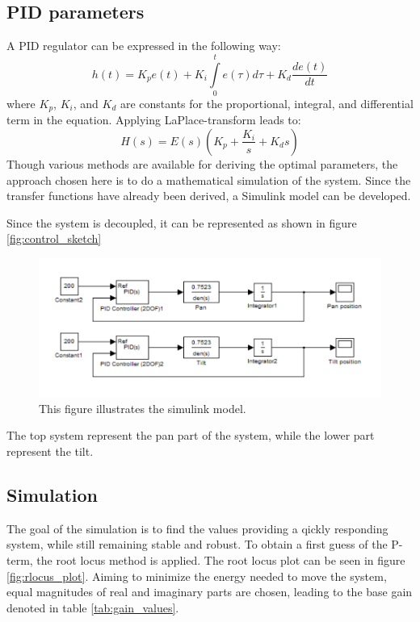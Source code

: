 \subsection{PID parameters}
A PID regulator can be expressed in the following way:
\begin{equation}
	h(t) = K_p e(t) + K_i \int\limits_0^t e(\tau) d\tau + K_d \frac{de(t)}{dt}
\end{equation}
where $K_p$, $K_i$, and $K_d$ are constants for the proportional, integral, and differential term in the equation. Applying LaPlace-transform leads to:
\begin{equation}
	H(s) = E(s)(K_p + \frac{K_i}{s} + K_d s)
\end{equation}
Though various methods are available for deriving the optimal parameters, the
approach chosen here is to do a mathematical simulation of the system. Since the
transfer functions have already been derived, a Simulink model can be developed.

Since the system is decoupled, it can be represented as shown in figure \ref{fig:control_sketch}
\begin{figure}[htb]
	\centering
	\includegraphics[width=\textwidth,trim=0 0 0 0]{graphics/Simulink.pdf} %
	\caption{This figure illustrates the simulink model.}
	\label{fig:control_simulink}			%
\end{figure}
The top system represent the pan part of the system, while the lower part represent the tilt.

\subsection{Simulation}
The goal of the simulation is to find the values providing a qickly responding system, while still remaining stable and robust. To obtain a first guess of the P-term, the root locus method is applied. The root locus plot can be seen in figure \ref{fig:rlocus_plot}. Aiming to minimize the energy needed to move the system, equal magnitudes of real and imaginary parts are chosen, leading to the base gain denoted in table \ref{tab:gain_values}.

